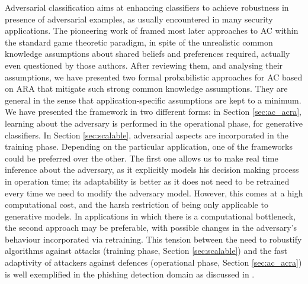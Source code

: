 Adversarial classification aims at enhancing classifiers to achieve robustness in presence of adversarial examples, as usually encountered in many security applications. The pioneering work of \cite{adversarialClassification2004} framed most later approaches to AC 
within the standard game theoretic paradigm, in spite of the unrealistic common knowledge assumptions about shared beliefs and preferences required, actually even questioned by those authors. After reviewing them, and analysing  their assumptions, we have presented two formal probabilistic approaches for AC based on ARA that mitigate 
such strong common knowledge assumptions.
They are general in the sense that application-specific assumptions are kept to a minimum. 
%
We have presented the framework in two different forms: in Section \ref{sec:ac_acra}, learning about the adversary is performed in the
operational phase, for generative classifiers. In Section \ref{sec:scalable}, adversarial aspects are incorporated in the training phase. Depending on the particular application, one of the frameworks could be preferred over the other. The first one allows us to make real time inference about the adversary, as it explicitly models his decision making process in operation time; its adaptability is better as it does not need to be retrained every time we need to modify the adversary model. However, this comes at a high computational cost, and the harsh restriction of being only applicable to generative models. In applications in which there is a computational bottleneck, the second approach may be preferable, with possible changes in the adversary's behaviour incorporated via retraining.
This tension between the need to robustify algorithms against attacks (training phase, Section  \ref{sec:scalable}) and the fast adaptivity of attackers against defences (operational phase, Section \ref{sec:ac_acra}) is well exemplified in the phishing detection domain as discussed in \cite{rakesh}.







